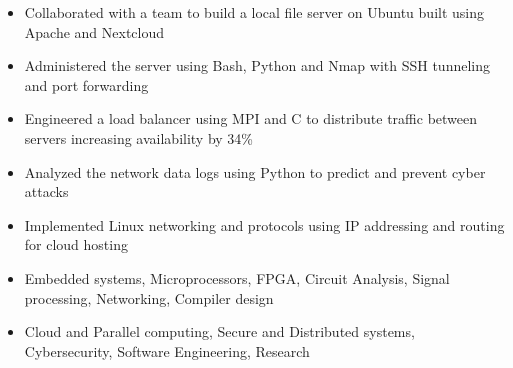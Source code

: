 \documentclass[11pt,a4paper,ragged2e]{altacv}
\begin{document}
\begin{paracol}{1}

\begin{itemize}
\item Collaborated with a team to build a local file server on Ubuntu built using Apache and Nextcloud
\item Administered the server using Bash, Python and Nmap with SSH tunneling and port forwarding
\item Engineered a load balancer using MPI and C to distribute traffic between servers increasing availability by 34\%
\item Analyzed the network data logs using Python to predict and prevent cyber attacks
\item Implemented Linux networking and protocols using IP addressing and routing for cloud hosting
\end{itemize}

\medskip

\begin{itemize} 
\item Embedded systems, Microprocessors, FPGA, Circuit Analysis, Signal processing, Networking,  Compiler design
\item Cloud and Parallel computing, Secure and Distributed systems, Cybersecurity, Software Engineering, Research
\end{itemize}


\end{paracol}
\end{document}
